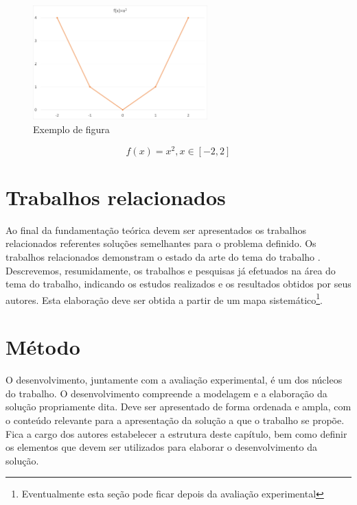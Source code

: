 \documentclass[12pt]{article}
\begin{document}
\begin{figure}[!ht]
 \centering
 \includegraphics[width=0.6\textwidth]{figures/figura.png}
 \caption{Exemplo de figura}
 \label{fig_exemplo}
\end{figure}	

\begin{equation}
\label{eq_exemplo}
 f(x) = x^2, x \in [-2,2]
\end{equation}


	
	
	\section{Trabalhos relacionados}
	\label{sec_trab_relacionados}
	
	Ao final da fundamentação teórica devem ser apresentados os trabalhos relacionados referentes soluções semelhantes para o problema definido. Os trabalhos relacionados demonstram o estado da arte do tema do trabalho \citep{wazlawick_metodologia_2017}. Descrevemos, resumidamente, os trabalhos e pesquisas já efetuados na área do tema do trabalho, indicando os estudos realizados e os resultados obtidos por seus autores. Esta elaboração deve ser obtida a partir de um mapa sistemático\footnote{Eventualmente esta seção pode ficar depois da avaliação experimental}. 
	
	\section{Método}
	\label{sec_metodo}
	
	O desenvolvimento, juntamente com a avaliação experimental, é um dos núcleos do trabalho. O desenvolvimento compreende a modelagem e a elaboração da solução propriamente dita. Deve ser apresentado de forma ordenada e ampla, com o conteúdo relevante para a apresentação da solução a que o trabalho se propõe. Fica a cargo dos autores estabelecer a estrutura deste capítulo, bem como definir os elementos que devem ser utilizados para elaborar o desenvolvimento da solução. 
	
\end{document}
